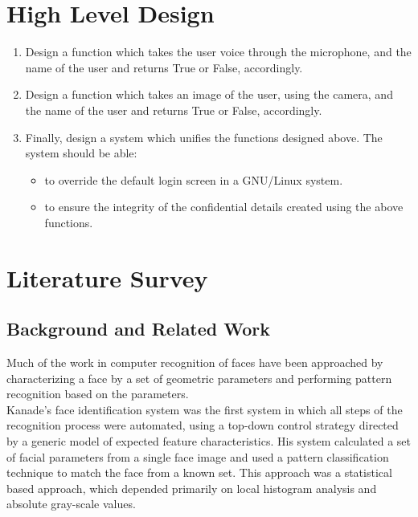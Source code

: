 \section{High Level Design}
\begin{enumerate}
  \item Design a function which takes the user voice through the microphone,
        and the name of the user and returns True or False, accordingly.
  \item Design a function which takes an image of the user, using the camera,
        and the name of the user and returns True or False, accordingly.
  \item Finally, design a system which unifies the functions designed above.
        The system should be able:
        \begin{itemize}
          \item to override the default login screen in a GNU/Linux system.
          \item to ensure the integrity of the confidential details created
                using the above functions.
        \end{itemize}
\end{enumerate}

\section{Literature Survey}

\subsection{Background and Related Work}
Much of the work in computer recognition of faces have been approached by
characterizing a face by a set of geometric parameters and performing pattern
recognition based on the parameters. \\
Kanade's face identification system \cite{Kanade1973} was the first system in which all
steps of the recognition process were automated, using a top-down control strategy
directed by a generic model of expected feature characteristics. His system calculated
a set of facial parameters from a single face image and used a pattern classification
technique to match the face from a known set. This approach was a statistical
based approach, which depended primarily on local histogram analysis and absolute
gray-scale values. \\

